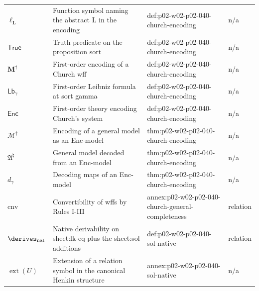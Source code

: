 \begin{longtable}{@{}p{}p{}p{}p{}@{}}
\(\ell_{\mathbf L}\) & Function symbol naming the abstract L in the encoding & def:\allowbreak{}p02-\allowbreak{}w02-\allowbreak{}p02-\allowbreak{}040-\allowbreak{}church-\allowbreak{}encoding & n/a \\
\(\mathsf{True}\) & Truth predicate on the proposition sort & def:\allowbreak{}p02-\allowbreak{}w02-\allowbreak{}p02-\allowbreak{}040-\allowbreak{}church-\allowbreak{}encoding & n/a \\
\(\mathbf M^\dagger\) & First-order encoding of a Church wff & def:\allowbreak{}p02-\allowbreak{}w02-\allowbreak{}p02-\allowbreak{}040-\allowbreak{}church-\allowbreak{}encoding & n/a \\
\(\mathsf{Lb}_\gamma\) & First-order Leibniz formula at sort gamma & def:\allowbreak{}p02-\allowbreak{}w02-\allowbreak{}p02-\allowbreak{}040-\allowbreak{}church-\allowbreak{}encoding & n/a \\
\(\mathsf{Enc}\) & First-order theory encoding Church's system & def:\allowbreak{}p02-\allowbreak{}w02-\allowbreak{}p02-\allowbreak{}040-\allowbreak{}church-\allowbreak{}encoding & n/a \\
\(\mathcal M^\dagger\) & Encoding of a general model as an Enc-model & thm:\allowbreak{}p02-\allowbreak{}w02-\allowbreak{}p02-\allowbreak{}040-\allowbreak{}church-\allowbreak{}encoding & n/a \\
\(\mathfrak A^\natural\) & General model decoded from an Enc-model & thm:\allowbreak{}p02-\allowbreak{}w02-\allowbreak{}p02-\allowbreak{}040-\allowbreak{}church-\allowbreak{}encoding & n/a \\
\(d_\gamma\) & Decoding maps of an Enc-model & thm:\allowbreak{}p02-\allowbreak{}w02-\allowbreak{}p02-\allowbreak{}040-\allowbreak{}church-\allowbreak{}encoding & n/a \\
\(\mathrel{\mathrm{cnv}}\) & Convertibility of wffs by Rules I-III & annex:\allowbreak{}p02-\allowbreak{}w02-\allowbreak{}p02-\allowbreak{}040-\allowbreak{}church-\allowbreak{}general-\allowbreak{}completeness & relation \\
\(\derives_{\mathrm{nat}}\) & Native derivability on sheet:lk-eq plus the sheet:sol additions & def:\allowbreak{}p02-\allowbreak{}w02-\allowbreak{}p02-\allowbreak{}040-\allowbreak{}sol-\allowbreak{}native & relation \\
\(\operatorname{ext}(U)\) & Extension of a relation symbol in the canonical Henkin structure & annex:\allowbreak{}p02-\allowbreak{}w02-\allowbreak{}p02-\allowbreak{}040-\allowbreak{}sol-\allowbreak{}native & n/a \\

\end{longtable}
